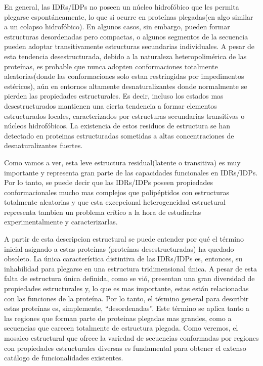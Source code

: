 En general, las IDRs/IDPs no poseen un núcleo hidrofóbico que les permita plegarse espontáneamente, lo que si ocurre en proteínas plegadas(en algo similar a un colapso hidrofóbico).  
En algunos casos, sin embargo, pueden formar estructuras desordenadas pero compactas, o algunos segmentos de la secuencia pueden adoptar transitivamente estructuras secundarias individuales.
A pesar de esta tendencia desestructurada, debido a la naturaleza heteropolimérica de las proteínas, es probable que nunca adopten 
conformaciones totalmente aleatorias(donde las conformaciones solo estan restringidas por impedimentos estéricos), aún en entornos altamente desnaturalizantes donde normalmente se pierden las propiedades estructurales.
Es decir, incluso los estados mas desestructurados mantienen una cierta tendencia a formar elementos estructurados locales, caracterizados por estructuras secundarias transitivas o núcleos hidrofóbicos.
La existencia de estos residuos de estructura se han detectado en proteinas estructuradas sometidas a altas concentraciones de desnaturalizantes fuertes. 

Como vamos a ver, esta leve estructura residual(latente o transitiva) es muy importante y representa gran parte de las capacidades funcionales en IDRs/IDPs.
Por lo tanto, se puede decir que las IDRs/IDPs poseen propiedades conformacionales mucho mas complejos que polipéptidos con estructuras totalmente aleatorias y que esta excepcional heterogeneidad estructural
representa tambien un problema crítico a la hora de estudiarlas experimentalmente y caracterizarlas.

A partir de esta descripcion estructural se puede entender por qué el término inicial asignado a estas proteínas (proteínas desestructuradas) ha quedado obsoleto.
La única característica distintiva de las IDRs/IDPs es, entonces, su inhabilidad para plegarse en una estructura tridimensional única.
A pesar de esta falta de estructura única definida, como se vió, presentan una 
gran diversidad de propiedades estructurales y, lo que es mas importante, estas están relacionadas con las funciones de la proteína. 
Por lo tanto, el término general para describir estas proteínas es, simplemente, ``desordenadas''. 
Este término se aplica tanto a las regiones que forman parte de proteinas plegadas mas grandes, como a secuencias que carecen totalmente de estructura plegada. 
Como veremos, el mosaico estructural que ofrece la variedad de secuencias conformadas por regiones con propiedades estructurales diversas es fundamental para obtener el extenso catálogo de funcionalidades existentes.    




